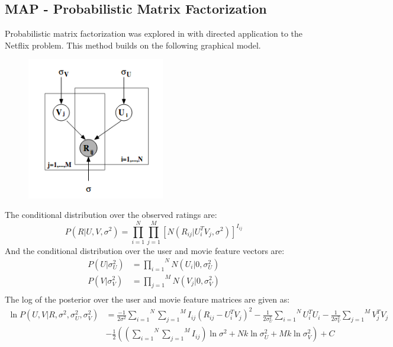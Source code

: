 \documentclass[journal,onecolumn]{IEEEtran}
\begin{document}
\subsection{MAP - Probabilistic Matrix Factorization}
Probabilistic matrix factorization was explored in with directed application to the Netflix problem. This method builds on the following graphical model.
\begin{figure}[H]
	\centering
	\includegraphics[width=60mm]{pmf-model}
\end{figure}
The conditional distribution over the observed ratings are:
\begin{equation}
	P(R | U, V, \sigma^2) = \overset{N}{\underset{i=1}{\prod}}\overset{M}{\underset{j=1}{\prod}}[N(R_{ij} | U_i^TV_j, \sigma^2)]^{I_{ij}}
\end{equation}
And the conditional distribution over the user and movie feature vectors are:
\begin{equation}
	\begin{split}
		P(U | \sigma^2_{U}) &= \overset{N}{\underset{i=1}{\prod}}N(U_i|0, \sigma^2_{U})\\
		P(V | \sigma^2_{V}) &= \overset{M}{\underset{j=1}{\prod}}N(V_j|0, \sigma^2_{V})\\
	\end{split}
\end{equation}
The log of the posterior over the user and movie feature matrices are given as:
\begin{equation}
\begin{split}
	\ln P(U, V | R, \sigma^2, \sigma^2_{U}, \sigma^2_{V} ) &= \frac{-1}{2\sigma^2}\overset{N}{\underset{i=1}{\sum}}\overset{M}{\underset{j=1}{\sum}}I_{ij}(R_{ij}-U_i^TV_j)^2-\frac{1}{2\sigma^2_{U}}\overset{N}{\underset{i=1}{\sum}}U_i^TU_i-\frac{1}{2\sigma^2_{V}}\overset{M}{\underset{j=1}{\sum}}V_j^TV_j\\
	&-\frac{1}{2}((\overset{N}{\underset{i=1}{\sum}}\overset{M}{\underset{j=1}{\sum}}I_{ij})\ln \sigma^2 + Nk\ln \sigma^2_U+Mk\ln \sigma^2_V) + C
\end{split}
\end{equation}
\end{document}
